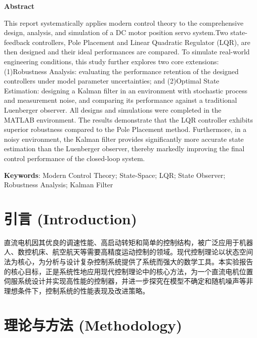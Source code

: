 \documentclass[12pt, a4paper]{article}
\begin{document}
\begin{center}
    \bfseries\large Abstract
\end{center}
\noindent
This report systematically applies modern control theory to the comprehensive design, analysis, and simulation of a DC motor position servo system.Two state-feedback controllers, Pole Placement and Linear Quadratic Regulator (LQR), are then designed and their ideal performances are compared. To simulate real-world engineering conditions, this study further explores two core extensions: (1)Robustness Analysis: evaluating the performance retention of the designed controllers under model parameter uncertainties; and (2)Optimal State Estimation: designing a Kalman filter in an environment with stochastic process and measurement noise, and comparing its performance against a traditional Luenberger observer. All designs and simulations were completed in the MATLAB environment. The results demonstrate that the LQR controller exhibits superior robustness compared to the Pole Placement method. Furthermore, in a noisy environment, the Kalman filter provides significantly more accurate state estimation than the Luenberger observer, thereby markedly improving the final control performance of the closed-loop system.
\vspace{1em}

\noindent
\textbf{Keywords}: Modern Control Theory; State-Space; LQR; State Observer; Robustness Analysis; Kalman Filter


\tableofcontents 
\newpage

\section{引言 (Introduction)}
直流电机因其优良的调速性能、高启动转矩和简单的控制结构，被广泛应用于机器人、数控机床、航空航天等需要高精度运动控制的领域。现代控制理论以状态空间法为核心，为分析与设计复杂控制系统提供了系统而强大的数学工具。本实验报告的核心目标，正是系统性地应用现代控制理论中的核心方法，为一个直流电机位置伺服系统设计并实现高性能的控制器，并进一步探究在模型不确定和随机噪声等非理想条件下，控制系统的性能表现及改进策略。

\section{理论与方法 (Methodology)}
\end{document}
